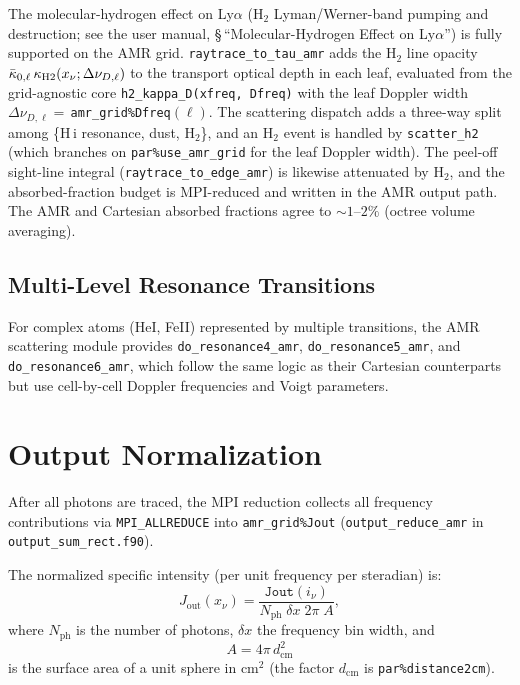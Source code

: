 \documentclass[english,a4paper]{my_memo}
\begin{document}
The molecular-hydrogen effect on Ly$\alpha$ (H$_2$ Lyman/Werner-band pumping and
destruction; see the user manual, \S\,``Molecular-Hydrogen Effect on Ly$\alpha$'')
is fully supported on the AMR grid. \texttt{raytrace\_to\_tau\_amr} adds the H$_2$
line opacity $\bar\kappa_{0,\ell}\,\kappa_{\rm H2}(x_\nu;\Delta\nu_{D,\ell})$ to the
transport optical depth in each leaf, evaluated from the grid-agnostic core
\texttt{h2\_kappa\_D(xfreq, Dfreq)} with the leaf Doppler width
$\Delta\nu_{D,\ell}=$\,\texttt{amr\_grid\%Dfreq}$(\ell)$. The scattering dispatch
adds a three-way split among \{H\,{\sc i} resonance, dust, H$_2$\}, and an H$_2$
event is handled by \texttt{scatter\_h2} (which branches on \texttt{par\%use\_amr\_grid}
for the leaf Doppler width). The peel-off sight-line integral
(\texttt{raytrace\_to\_edge\_amr}) is likewise attenuated by H$_2$, and the
absorbed-fraction budget is MPI-reduced and written in the AMR output path. The AMR
and Cartesian absorbed fractions agree to $\sim1$--$2\%$ (octree volume averaging).

\subsection{Multi-Level Resonance Transitions}

\begin{sloppypar}
For complex atoms (HeI, FeII) represented by multiple transitions, the AMR
scattering module provides \texttt{do\_resonance4\_amr},
\texttt{do\_resonance5\_amr}, and \texttt{do\_resonance6\_amr}, which follow
the same logic as their Cartesian counterparts but use cell-by-cell Doppler
frequencies and Voigt parameters.
\end{sloppypar}

\section{Output Normalization}

After all photons are traced, the MPI reduction collects all frequency
contributions via \texttt{MPI\_ALLREDUCE} into \texttt{amr\_grid\%Jout}
(\texttt{output\_reduce\_amr} in \texttt{output\_sum\_rect.f90}).

The normalized specific intensity (per unit frequency per steradian) is:
\begin{equation}
  J_\mathrm{out}(x_\nu) = \frac{\texttt{Jout}(i_\nu)}
    {N_\mathrm{ph}\;\delta x\;2\pi\;A},
\end{equation}
where $N_\mathrm{ph}$ is the number of photons, $\delta x$ the frequency bin
width, and
\begin{equation}
  A = 4\pi\,d_\mathrm{cm}^2
\end{equation}
is the surface area of a unit sphere in cm$^2$ (the factor $d_\mathrm{cm}$
is \texttt{par\%distance2cm}).
\end{document}
